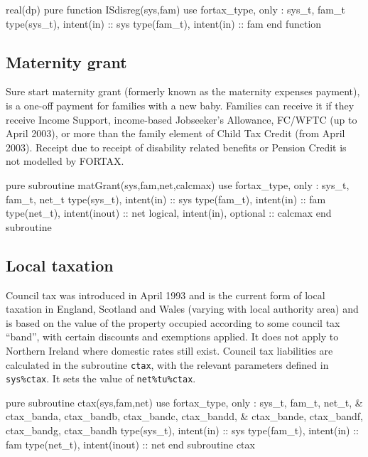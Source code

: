 \documentclass[11pt,thmsa,letter,ukenglish]{article}
\begin{document}
\begin{fortrancode}
real(dp) pure function ISdisreg(sys,fam)
    use fortax_type, only : sys_t, fam_t
    type(sys_t), intent(in) :: sys
    type(fam_t), intent(in) :: fam
end function
\end{fortrancode}

\subsection{Maternity grant}
Sure start maternity grant (formerly known as the maternity expenses payment), is a one-off payment for families with a new baby. Families can receive it if they receive Income Support, income-based Jobseeker's Allowance, FC/WFTC (up to April 2003), or more than the family element of Child Tax Credit (from April 2003). Receipt due to receipt of disability related benefits or Pension Credit is not modelled by FORTAX.

\begin{fortrancode}
pure subroutine matGrant(sys,fam,net,calcmax)
    use fortax_type, only : sys_t, fam_t, net_t
    type(sys_t), intent(in)           :: sys
    type(fam_t), intent(in)           :: fam
    type(net_t), intent(inout)        :: net
    logical,     intent(in), optional :: calcmax
end subroutine
\end{fortrancode}

\subsection{Local taxation}

Council tax was introduced in April 1993 and is the current form of local taxation in England, Scotland and Wales (varying with local authority area) and is based on the value of the property occupied according to some council tax ``band'', with certain discounts and exemptions applied. It does not apply to Northern Ireland where domestic rates still exist. Council tax liabilities are calculated in the subroutine \texttt{ctax}, with the relevant parameters defined in \texttt{sys\%ctax}. It sets the value of \texttt{net\%tu\%ctax}.

\begin{fortrancode}
pure subroutine ctax(sys,fam,net)
    use fortax_type, only : sys_t, fam_t, net_t, &
    ctax_banda, ctax_bandb, ctax_bandc, ctax_bandd, &
    ctax_bande, ctax_bandf, ctax_bandg, ctax_bandh
    type(sys_t), intent(in)    :: sys
    type(fam_t), intent(in)    :: fam
    type(net_t), intent(inout) :: net
end subroutine ctax
\end{fortrancode}
\end{document}
